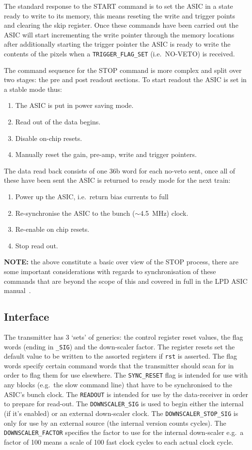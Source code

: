 The standard response to the START command is to set the ASIC in a state ready to write to its memory, this means reseting the write and trigger points and clearing the skip register. Once these commands have been carried out the ASIC will start incrementing the write pointer through the memory locations after additionally starting the trigger pointer the ASIC is ready to write the contents of the pixels when a \texttt{TRIGGER\_FLAG\_SET} (i.e.\ NO-VETO) is received. 

The command sequence for the STOP command is more complex and split over two stages: the pre and post readout sections. To start readout the ASIC is set in a stable mode thus:
\begin{enumerate}
  \item The ASIC is put in power saving mode.
  \item Read out of the data begins.
  \item Disable on-chip resets.
  \item Manually reset the gain, pre-amp, write and trigger pointers.
\end{enumerate}
The data read back consists of one 36b word for each no-veto sent, once all of these have been sent the ASIC is returned to ready mode for the next train:
\begin{enumerate}
  \item Power up the ASIC, i.e.\ return bias currents to full
  \item Re-synchronise the ASIC to the bunch (\( \sim \)4.5~MHz) clock.
  \item Re-enable on chip resets.
  \item Stop read out.
\end{enumerate}
\textbf{NOTE:} the above constitute a basic over view of the STOP process, there are some important considerations with regards to synchronisation of these commands that are beyond the scope of this and covered in full in the LPD ASIC manual~\cite{LPD manual again}.
\subsection{Interface} %
\label{sub:tx_interface}
The transmitter has 3 `sets' of generics: the control register reset values, the flag words (ending in \texttt{\_SIG}) and the down-scaler factor. The register resets set the default value to be written to the assorted registers if \texttt{rst} is asserted. The flag words specify certain command words that the transmitter should scan for in order to flag them for use elsewhere. The \texttt{\texttt{SYNC\_RESET}} flag is intended for use with any blocks (e.g.\ the slow command line) that have to be synchronised to the ASIC's bunch clock. The \texttt{READOUT} is intended for use by the data-receiver in order to prepare for read-out. The \texttt{DOWNSCALER\_SIG} is used to begin either the internal (if it's enabled) or an external down-scaler clock. The \texttt{DOWNSCALER\_STOP\_SIG} is only for use by an external source (the internal version counts cycles). The \texttt{DOWNSCALER\_FACTOR} specifies the factor to use for the internal down-scaler e.g.\ a factor of 100 means a scale of 100 fast clock cycles to each actual clock cycle.
    
